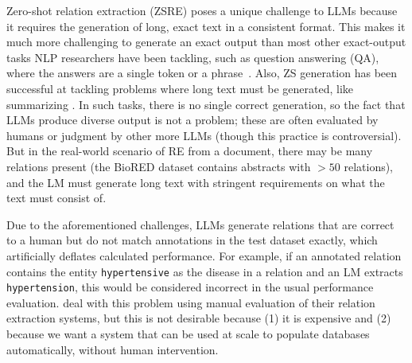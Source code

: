 \documentclass[11pt]{article}
\begin{document}
Zero-shot relation extraction (ZSRE) poses a unique challenge to LLMs because it requires the generation of long, exact text in a consistent format. This makes it much more challenging to generate an exact output than most other exact-output tasks NLP researchers have been tackling, such as question answering (QA), where the answers are a single token or a phrase~\cite{touvron2023llama, wang-etal-2023-self-instruct, openai2023gpt4}. Also, ZS generation has been successful at tackling problems where long text must be generated, like summarizing \cite{touvron2023llama, wang-etal-2023-self-instruct, openai2023gpt4}. In such tasks, there is no single correct generation, so the fact that LLMs produce diverse output is not a problem; these are often evaluated by humans or judgment by other more  LLMs (though this practice is controversial). But in the real-world scenario of RE from a document, there may be many relations present (the BioRED \cite{luo2022biored} dataset contains abstracts with $> 50$ relations), and the LM must generate long text with stringent requirements on what the text must consist of.

Due to the aforementioned challenges, LLMs generate relations that are correct to a human but do not match annotations in the test dataset exactly, which artificially deflates calculated performance.  For example, if an annotated relation contains the entity \texttt{hypertensive} as the disease in a relation and an LM extracts \texttt{hypertension}, this would be considered incorrect in the usual performance evaluation.  \citet{wadhwa-etal-2023-revisiting} deal with this problem using manual evaluation of their relation extraction systems, but this is not desirable because (1) it is expensive and (2) because we want a system that can be used at scale to populate databases automatically, without human intervention. 

\end{document}

